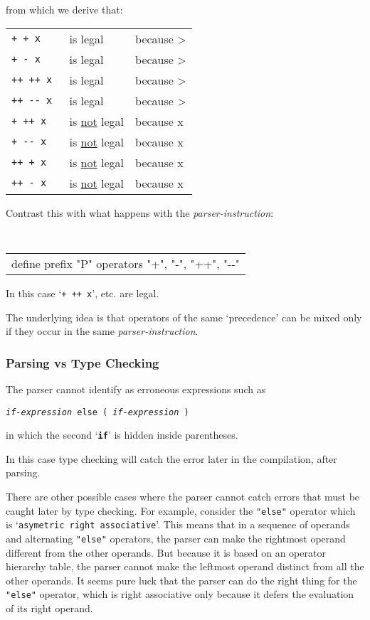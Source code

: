 \documentclass[12pt]{article}
\newcommand{\TT}[1]{{\tt \bfseries #1}}
\begin{document}
from which we derive that:
\begin{center}
\begin{tabular}{lll}
\tt + + x	& is legal & because \RX{+} > \RX{+} \\
\tt + - x	& is legal & because \RX{+} > \RX{-} \\
\tt ++ ++ x	& is legal & because \RX{++} > \RX{++} \\
\tt ++ -{}- x	& is legal & because \RX{++} > \RX{-{}-} \\
\tt + ++ x	& is \underline{not} legal & because \RX{+} x \RX{++} \\
\tt + -{}- x	& is \underline{not} legal & because \RX{+} x \RX{-{}-} \\
\tt ++ + x	& is \underline{not} legal & because \RX{++} x \RX{+} \\
\tt ++ - x	& is \underline{not} legal & because \RX{++} x \RX{-} \\
\end{tabular}
\end{center}

Contrast this with what happens with the {\em parser-instruction}:
\begin{center}
\tt
\begin{tabular}{l}
define prefix "P" operators "+", "-", "++", "-{}-"  \\
\end{tabular}
\end{center}
In this case `{\tt + ++ x}', etc. are legal.

The underlying idea is that operators of the same `precedence' can be
mixed only if they occur in the same {\em parser-instruction}.

\subsubsection{Parsing vs Type Checking}

The parser cannot identify as erroneous expressions such as
\begin{center}
\tt {\em if-expression} else ( {\em if-expression} )
\end{center}
in which the second `\TT{if}' is hidden inside parentheses.

In this case type checking will catch the error later in the
compilation, after parsing.

There are other possible cases where the parser cannot catch
errors that must be caught later by type checking.
For example, consider the {\tt "else"} operator
which is `{\tt asymetric right associative}'.  This means
that in a sequence of operands and alternating {\tt "else"}
operators, the parser can make the rightmost operand different
from the other operands.  But because it is based on an
operator hierarchy table, the parser cannot
make the leftmost operand distinct from all the other operands.
It seems pure luck that the parser can do the right thing
for the {\tt "else"} operator, which is right associative only
because it defers the evaluation of its right operand.
\end{document}
